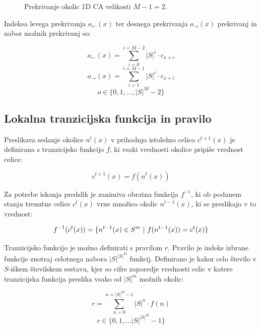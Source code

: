 \documentclass[12pt,a4paper,openany,twoside]{book}
\begin{document}
\begin{figure}[htb]
\centerline{}
\caption[Prekrivanje okolic 1D CA.]{Prekrivanje okolic 1D CA velikosti \(M-1=2\).}
\label{overlap_1d}
\end{figure}

Indeksa levega prekrivanja \(o_{\leftarrow}(x)\) ter desnega prekrivanja \(o_{\rightarrow}(x)\) prekrivanj in nabor možnih prekrivanj so:

\begin{equation}
o_{\leftarrow}(x) = \sum_{i=0}^{i=M-2} |S|^i \cdot c_{x+i}
\end{equation}
\begin{equation}
o_{\rightarrow}(x) = \sum_{i=1}^{i=M-1} |S|^i \cdot c_{x+i}
\end{equation}
\begin{equation}
o \in \{0, 1, \ldots, |S|^M-2\}
\end{equation}

\subsection{Lokalna tranzicijska funkcija in pravilo}

Preslikava sedanje okolice \(n^{t}(x)\) v prihodnjo istoležno celico \(c^{t+1}(x)\) je definirana
s tranzicijsko funkcijo \(f\), ki vsaki vrednosti okolice pripiše vrednost celice:

\begin{equation}
c^{t+1}(x) = f(n^{t}(x))
\end{equation}

Za potrebe iskanja predslik je zanimiva obratna funkcija \(f^{-1}\), ki ob
podanem stanju trenutne celice \(c^{t}(x)\) vrne množico okolic \(n^{t-1}(x)\),
ki se preslikajo v to vrednost:

\begin{equation}
f^{-1}(c^{t}(x)) = \{ n^{t-1}(x) \in S^m \ \arrowvert \ f(n^{t-1}(x)) = c^{t}(x) \}
\end{equation}

Tranzicijsko funkcijo je možno definirati s pravilom  \(r\).
Pravilo je indeks izbrane funkcije znotraj celotnega nabora \(|S|^{|S|^M}\) funkcij.
Definirano je kakor celo število v \(S\)-iškem številskem sestavu,
kjer so cifre zaporedje vrednosti celic v katere tranzicijska funkcija
preslika vsako od \(|S|^m\) možnih okolic:

\begin{equation}
r = \sum_{n=0}^{n=|S|^M-1} |S|^n \cdot f(n)
\end{equation}
\begin{equation}
r \in \{0, 1, \ldots |S|^{|S|^M}-1\}
\end{equation}
\end{document}
